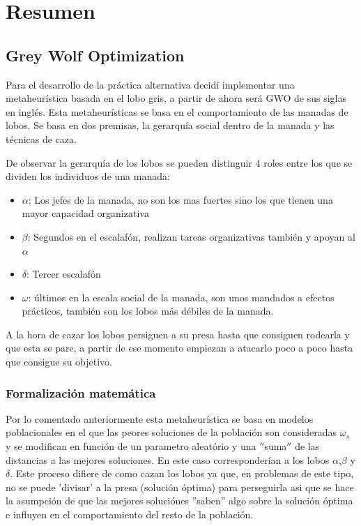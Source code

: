 \documentclass[a4paper, 12.5pt]{report}
\begin{document}
\tableofcontents


\section{Resumen}\label{sec:resumen}

\subsection{Grey Wolf Optimization}

Para el desarrollo de la práctica alternativa decidí implementar una metaheurística basada en el lobo gris, a partir de ahora será GWO de sus siglas en inglés. Esta metaheurísticas se basa en el comportamiento de las manadas de lobos. Se basa en dos premisas, la gerarquía social dentro de la manada y las técnicas de caza.

De observar la gerarquía de los lobos se pueden distinguir 4 roles entre los que se dividen los individuos de una manada:
\begin{itemize}
    \item $\alpha$: Los jefes de la manada, no son los mas fuertes sino los que tienen una mayor capacidad organizativa
    \item $\beta$: Segundos en el escalafón, realizan tareas organizativas también y apoyan al $\alpha$
    \item $\delta$: Tercer escalafón
    \item $\omega$: últimos en la escala social de la manada, son unos mandados a efectos prácticos, también son los lobos más débiles de la manada.
\end{itemize}


A la hora de cazar los lobos persiguen a su presa hasta que consiguen rodearla y que esta se pare, a partir de ese momento empiezan a atacarlo poco a poco hasta que consigue su objetivo.

\subsubsection{Formalización matemática}
Por lo comentado anteriormente esta metaheurística se basa en modelos poblacionales en el que las peores soluciones de la población son consideradas $\omega_s$ y se modifican en función de un parametro aleatório y una \(''\)suma\(''\) de las distancias a las mejores soluciones. En este caso corresponderían a los lobos $\alpha$,$\beta$ y $\delta$. Este proceso difiere de como cazan los lobos ya que, en problemas de este tipo, no se puede 'divisar' a la presa (solución óptima) para perseguirla asi que se hace la asumpción de que las mejores soluciónes ''saben'' algo sobre la solución óptima e influyen en el comportamiento del resto de la población.
\end{document}
